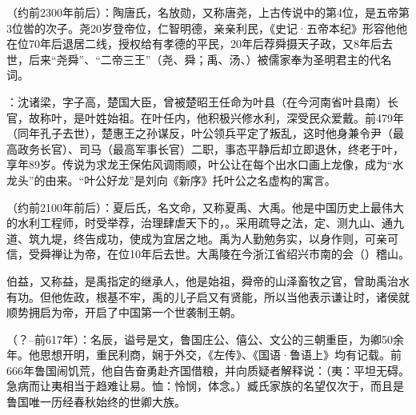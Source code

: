 （约前2300年前后）：陶唐氏，名放勋，又称唐尧，上古传说中的第4位，是五帝第3位喾的次子。尧20岁登帝位，仁智明德，亲亲利民，《史记·五帝本纪》形容他他在位70年后退居二线，授权给有孝德的平民，20年后荐舜摄天子政，又8年后去世，后来“尧舜”、“二帝三王”（尧、舜；禹、汤、）被儒家奉为圣明君主的代名词。

：沈诸梁，字子高，楚国大臣，曾被楚昭王任命为叶县（在今河南省叶县南）长官，故称叶，是叶姓始祖。在叶任内，他积极兴修水利，深受民众爱戴。前479年（同年孔子去世），楚惠王之孙谋反，叶公领兵平定了叛乱，这时他身兼令尹（最高政务长官）、司马（最高军事长官）二职，事态平静后却立即退休，终老于叶，享年89岁。传说为求龙王保佑风调雨顺，叶公让在每个出水口画上龙像，成为“水龙头”的由来。“叶公好龙”是刘向《新序》托叶公之名虚构的寓言。

（约前2100年前后）：夏后氏，名文命，又称夏禹、大禹。他是中国历史上最伟大的水利工程师，时受举荐，治理肆虐天下的，。采用疏导之法，定、测九山、通九道、筑九堤，终告成功，使成为宜居之地。禹为人勤勉务实，以身作则，可亲可信，受舜禅让为帝，在位10年后去世。大禹陵在今浙江省绍兴市南的会（）稽山。

伯益，又称益，是禹指定的继承人，他是始祖，舜帝的山泽畜牧之官，曾助禹治水有功。但他佐政，根基不牢，禹的儿子启又有贤能，所以当他表示谦让时，诸侯就顺势拥启为帝，开启了中国第一个世袭制王朝。

（？--前617年）：名辰，谥号是文，鲁国庄公、僖公、文公的三朝重臣，为卿50余年。他思想开明，重民利商，娴于外交，《左传》、《国语·鲁语上》均有记载。前666年鲁国闹饥荒，他自告奋勇赴齐国借粮，并向质疑者解释说：（夷：平坦无碍。急病而让夷相当于趋难让易。恤：怜悯，体念。）臧氏家族的名望仅次于，而且是鲁国唯一历经春秋始终的世卿大族。

